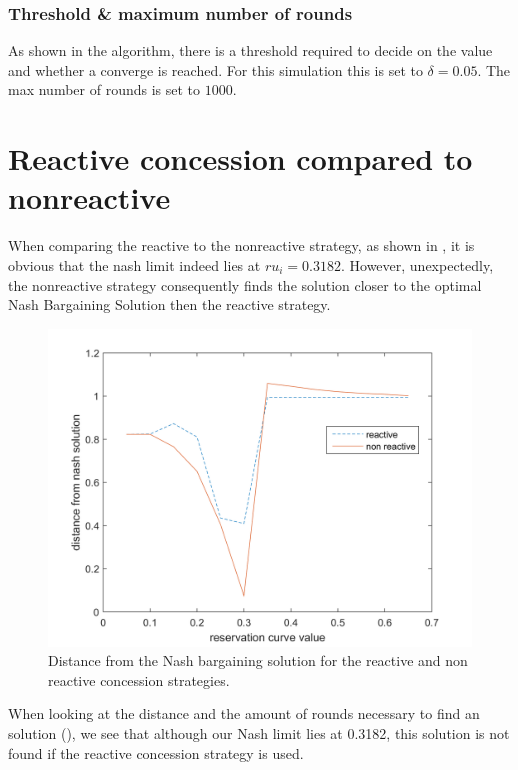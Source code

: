 \subsubsection{Threshold \& maximum number of rounds}
As shown in the algorithm, there is a threshold required to decide on the value and whether a converge is reached. For this simulation this is set to $\delta = 0.05$.	The max number of rounds is set to $1000$.

\section{Reactive concession compared to nonreactive}
When comparing the reactive to the nonreactive strategy, as shown in , it is obvious that the nash limit indeed lies at $ru_i = 0.3182$. However, unexpectedly, the nonreactive strategy consequently finds the solution closer to the optimal Nash Bargaining Solution then the reactive strategy. 

\begin{figure}[h]
	\centering
	\includegraphics[width=0.7\linewidth]{img/reactivevsnonreactive}
	\caption{Distance from the Nash bargaining solution for the reactive and non reactive concession strategies. }
	\label{fig:reactivevsnonreactive}
\end{figure}

When looking at the distance and the amount of rounds necessary to find an solution (), we see that although our Nash limit lies at 0.3182, this solution is not found if the reactive concession strategy is used. 

